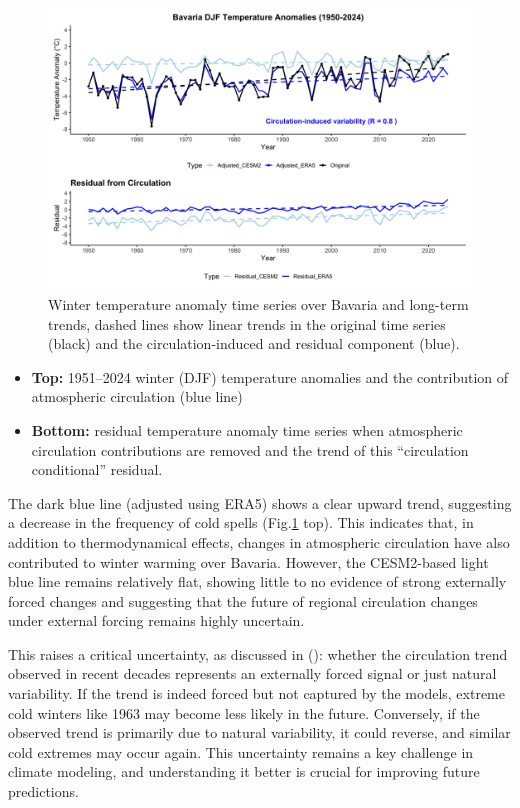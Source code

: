 \documentclass[
]{krantz}
\providecommand{\tightlist}{%
  \setlength{\itemsep}{0pt}\setlength{\parskip}{0pt}}
\begin{document}
\begin{figure}

{\centering \includegraphics[width=0.9\linewidth]{work/03-coldex/figures//dynamical_adjustment} 

}

\caption{Winter temperature anomaly time series over Bavaria and long-term trends, dashed lines show linear trends in the original time series (black) and the circulation-induced and residual component (blue).}\label{fig:dynamical-trend}
\end{figure}

\begin{itemize}
\tightlist
\item
  \textbf{Top:} 1951--2024 winter (DJF) temperature anomalies and the contribution of atmospheric circulation (blue line)
\item
  \textbf{Bottom:} residual temperature anomaly time series when atmospheric circulation contributions are removed and the trend of this ``circulation conditional'' residual.
\end{itemize}

The dark blue line (adjusted using ERA5) shows a clear upward trend, suggesting a decrease in the frequency of cold spells (Fig.\ref{fig:dynamical-trend} top). This indicates that, in addition to thermodynamical effects, changes in atmospheric circulation have also contributed to winter warming over Bavaria. However, the CESM2-based light blue line remains relatively flat, showing little to no evidence of strong externally forced changes and suggesting that the future of regional circulation changes under external forcing remains highly uncertain.

This raises a critical uncertainty, as discussed in (\citet{sippel2024}): whether the circulation trend observed in recent decades represents an externally forced signal or just natural variability. If the trend is indeed forced but not captured by the models, extreme cold winters like 1963 may become less likely in the future. Conversely, if the observed trend is primarily due to natural variability, it could reverse, and similar cold extremes may occur again. This uncertainty remains a key challenge in climate modeling, and understanding it better is crucial for improving future predictions.
\end{document}
